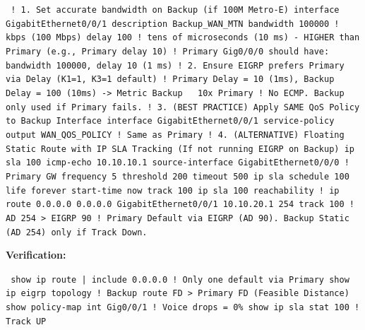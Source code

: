 \documentclass[11pt]{article}
\begin{document}
\begin{exoresolu}
\begin{flushleft}
\texttt{
! 1. Set accurate bandwidth on Backup (if 100M Metro-E)\newline
interface GigabitEthernet0/0/1\newline
 description Backup\_WAN\_MTN\newline
 bandwidth 100000      ! kbps (100 Mbps)\newline
 delay 100             ! tens of microseconds (10 ms) - HIGHER than Primary (e.g., Primary delay 10)\newline
! Primary Gig0/0/0 should have: bandwidth 100000, delay 10 (1 ms)\newline
\newline
! 2. Ensure EIGRP prefers Primary via Delay (K1=1, K3=1 default)\newline
! Primary Delay = 10 (1ms), Backup Delay = 100 (10ms) -> Metric Backup ~ 10x Primary\newline
! No ECMP. Backup only used if Primary fails.\newline
\newline
! 3. (BEST PRACTICE) Apply SAME QoS Policy to Backup Interface\newline
interface GigabitEthernet0/0/1\newline
 service-policy output WAN\_QOS\_POLICY   ! Same as Primary\newline
\newline
! 4. (ALTERNATIVE) Floating Static Route with IP SLA Tracking (If not running EIGRP on Backup)\newline
ip sla 100\newline
 icmp-echo 10.10.10.1 source-interface GigabitEthernet0/0/0  ! Primary GW\newline
 frequency 5\newline
 threshold 200\newline
 timeout 500\newline
ip sla schedule 100 life forever start-time now\newline
track 100 ip sla 100 reachability\newline
!\newline
ip route 0.0.0.0 0.0.0.0 GigabitEthernet0/0/1 10.10.20.1 254 track 100  ! AD 254 > EIGRP 90\newline
! Primary Default via EIGRP (AD 90). Backup Static (AD 254) only if Track Down.
}
\end{flushleft}

\noindent\textbf{Verification:}
\begin{flushleft}
\texttt{
show ip route | include 0.0.0.0  ! Only one default via Primary\newline
show ip eigrp topology          ! Backup route FD > Primary FD (Feasible Distance)\newline
show policy-map int Gig0/0/1    ! Voice drops = 0\%\newline
show ip sla stat 100            ! Track UP
}
\end{flushleft}


\end{exoresolu}
\end{document}
